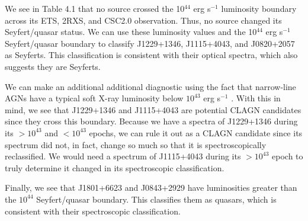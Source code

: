 



We see in Table 4.1 that no source crossed the 10$^{44}$ erg s$^{-1}$ luminosity boundary across its ETS, 2RXS, and CSC2.0 observation.
Thus, no source changed its Seyfert/quasar status.
We can use these luminosity values and the 10$^{44}$ erg s$^{-1}$ Seyfert/quasar boundary to classify J1229+1346, J1115+4043, and J0820+2057 as Seyferts.
This classification is consistent with their optical spectra, which also suggests they are Seyferts. 

We can make an additional additional diagnostic using the fact that narrow-line AGNs have a typical soft X-ray luminosity below $ 10^{43}$ erg s$^{-1}$ \citep{stocke1991}.
With this in mind, we see that J1229+1346 and J1115+4043 are potential CLAGN candidates since they cross this boundary.
Because we have a spectra of J1229+1346 during its $>10^{43}$ and $<10^{43}$ epochs, we can rule it out as a CLAGN candidate since its spectrum did not, in fact, change so much so that it is spectroscopically reclassified.
We would need a spectrum of J1115+4043 during its $>10^{43}$ epoch to truly determine it changed in its spectroscopic classification.

Finally, we see that J1801+6623 and J0843+2929 have luminosities greater than the $10^{44}$ Seyfert/quasar boundary.
This classifies them as quasars, which is consistent with their spectroscopic classification.





\FloatBarrier
















